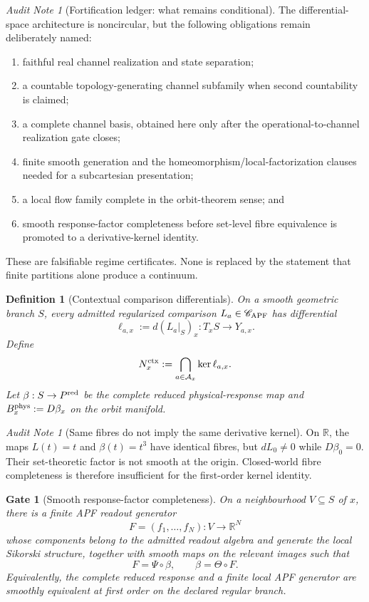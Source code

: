 \documentclass[11pt]{article}
\newtheorem{definition}[theorem]{Definition}
\newtheorem{gate}[theorem]{Gate}
\theoremstyle{remark}
\newtheorem{audit}[theorem]{Audit Note}
\begin{document}
\begin{audit}[Fortification ledger: what remains conditional]
The differential-space architecture is noncircular, but the following
obligations remain deliberately named:
\begin{enumerate}[label=(\roman*)]
\item faithful real channel realization and state separation;
\item a countable topology-generating channel subfamily when second countability
is claimed;
\item a complete channel basis, obtained here only after the
operational-to-channel realization gate closes;
\item finite smooth generation and the homeomorphism/local-factorization clauses
needed for a subcartesian presentation;
\item a local flow family complete in the orbit-theorem sense; and
\item smooth response-factor completeness before set-level fibre equivalence is
promoted to a derivative-kernel identity.
\end{enumerate}
These are falsifiable regime certificates.  None is replaced by the statement
that finite partitions alone produce a continuum.
\end{audit}

\begin{definition}[Contextual comparison differentials]
\label{def:contextual-comparison-differentials}
On a smooth geometric branch $S$, every admitted regularized comparison
$L_a\in\mathscr C_{\rm APF}$ has differential
\[
        \ell_{a,x}:=d(L_a|_S)_x:T_xS\to Y_{a,x}.
\]
Define
\[
        N_x^{\rm ctx}:=\bigcap_{a\in\mathcal A_x}\ker\ell_{a,x}.
\]
Let $\beta:S\to P^{\rm red}$ be the complete reduced physical-response map and
$B_x^{\rm phys}:=D\beta_x$ on the orbit manifold.
\end{definition}

\begin{audit}[Same fibres do not imply the same derivative kernel]
\label{audit:ts-fibre-derivative-counterexample}
On $\mathbb R$, the maps $L(t)=t$ and $\beta(t)=t^3$ have identical fibres, but
$dL_0\neq0$ while $D\beta_0=0$.  Their set-theoretic factor is not smooth at the
origin.  Closed-world fibre completeness is therefore insufficient for the
first-order kernel identity.
\end{audit}

\begin{gate}[Smooth response-factor completeness]
\label{gate:ts-smooth-response-factor-completeness}
On a neighbourhood $V\subseteq S$ of $x$, there is a finite APF readout
generator
\[
  F=(f_1,\ldots,f_N):V\to\mathbb R^N
\]
whose components belong to the admitted readout algebra and generate the local
Sikorski structure, together with smooth maps on the relevant images such that
\[
  F=\Psi\circ\beta,
  \qquad
  \beta=\Theta\circ F.
\]
Equivalently, the complete reduced response and a finite local APF generator
are smoothly equivalent at first order on the declared regular branch.
\end{gate}
\end{document}
